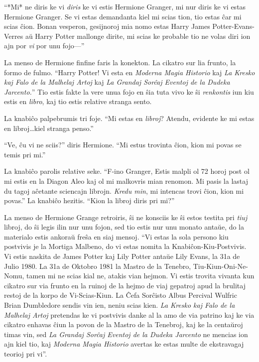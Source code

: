 ``*Mi* ne diris ke vi \emph{diris} ke vi estis Hermione Granger, mi
nur diris ke vi estas Hermione Granger. Se vi estas demandanta kiel mi
scias tion, tio estas ĉar mi scias ĉion. Bonan vesperon, gesijnoroj
mia nomo estas Harry James Potter-Evans-Verres aŭ Harry Potter
mallonge dirite, mi scias ke probable tio ne volas diri ion ajn por
\emph{vi} por unu fojo—''

La menso de Hermione finfine faris la konekton. La cikatro sur lia
frunto, la formo de fulmo. ``Harry Potter! Vi esta en \emph{Moderna
  Magia Historio} kaj \emph{La Kresko kaj Falo de la Malhelaj Artoj}
kaj \emph{La Grandaj Sorĉaj Eventoj de la Dudeka Jarcento.}'' Tio
estis fakte la vere unua fojo en ŝia tuta vivo ke ŝi \emph{renkontis}
iun kiu estis en \emph{libro}, kaj tio estis relative stranga sento.

La knabiĉo palpebrumis tri foje. ``Mi estas en \emph{libroj}? Atendu,
evidente ke mi estas en libroj\ldots kiel stranga penso.''

``Ve, ĉu vi ne sciis?'' diris Hermione. ``Mi estus trovinta ĉion, kion
mi povas se temis pri mi.''

La knabiĉo parolis relative seke. ``F-ino Granger, Estis malpli ol 72
horoj post ol mi estis en la Diagon Aleo kaj ol mi malkovris mian
renomon. Mi pasis la lastaj du tagoj aĉetante sciencajn
librojn. \emph{Kredu min}, mi intencas trovi ĉion, kion mi povas.'' La
knabiĉo hezitis. ``Kion la libroj diris pri mi?''

La menso de Hermione Grange retroiris, ŝi ne konsciis ke ŝi estos
testita pri \emph{tiuj} libroj, do ŝi legis ilin nur unu fojon, sed
tio estis nur unu monato antaŭe, do la materialo estis ankoraŭ freŝa
en siaj mensoj. ``Vi estas la sola persono kiu postvivis je la Mortiga
Malbeno, do vi estas nomita la Knabiĉon-Kiu-Postvivis. Vi estis naskita
de James Potter kaj Lily Potter antaŭe Lily Evans, la 31a de Julio
1980. La 31a de Oktobro 1981 la Mastro de la Tenebro,
Tiu-Kiun-Oni-Ne-Nomu, tamen mi ne scias kial ne, atakis vian
hejmon. Vi estis trovita vivanta kun cikatro sur via frunto en la
ruinoj de la hejmo de viaj gepatroj apud la brulitaj restoj de la
korpo de Vi-Scias-Kiun. La Ĉefa Sorĉisto Albus Percival Wulfric Brian
Dumbledore sendis vin ien, neniu scias kien. \emph{La Kresko kaj Falo
  de la Malhelaj Artoj} pretendas ke vi postvivis danke al la amo de
via patrino kaj ke via cikatro enhavas ĉiun la povon de la Mastro de
la Tenebroj, kaj ke la centaŭroj timas vin, sed \emph{La Grandaj
  Sorĉaj Eventoj de la Dudeka Jarcento} ne mencias ion ajn kiel tio,
kaj \emph{Moderna Magia Historio} avertas ke estas multe de
ekstravagaj teorioj pri vi''.

